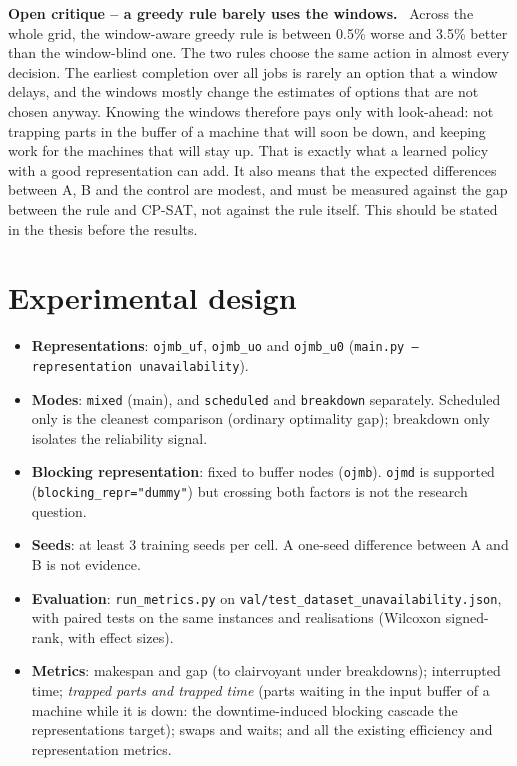 \documentclass[11pt,a4paper]{article}
\newenvironment{critique}[1]{%
  \par\medskip\noindent\textbf{\color{critic}Open critique -- #1.}\ }{\par\medskip}
\newcommand{\code}[1]{\texttt{#1}}
\begin{document}
\begin{critique}{a greedy rule barely uses the windows}
Across the whole grid, the window-aware greedy rule is between 0.5\% worse and 3.5\% better
than the window-blind one. The two rules choose the same action in almost every decision. The earliest
completion over all jobs is rarely an option that a window delays, and the windows mostly change
the estimates of options that are not chosen anyway. Knowing the windows therefore pays only
with look-ahead: not trapping parts in the buffer of a machine that will soon be down, and
keeping work for the machines that will stay up. That is exactly what a learned policy with a
good representation can add. It also means that the expected differences between A, B and the
control are modest, and must be measured against the gap between the rule and CP-SAT, not
against the rule itself. This should be stated in the thesis before the results.
\end{critique}

\section{Experimental design}
\label{sec:design}

\begin{itemize}[nosep]
  \item \textbf{Representations}: \code{ojmb\_uf}, \code{ojmb\_uo} and \code{ojmb\_u0}
        (\code{main.py --representation unavailability}).
  \item \textbf{Modes}: \code{mixed} (main), and \code{scheduled} and \code{breakdown} separately.
        Scheduled only is the cleanest comparison (ordinary optimality gap); breakdown only
        isolates the reliability signal.
  \item \textbf{Blocking representation}: fixed to buffer nodes (\code{ojmb}). \code{ojmd}
        is supported (\code{blocking\_repr="dummy"}) but crossing both factors is not the
        research question.
  \item \textbf{Seeds}: at least 3 training seeds per cell. A one-seed difference between A and
        B is not evidence.
  \item \textbf{Evaluation}: \code{run\_metrics.py} on \code{val/test\_dataset\_unavailability.json},
        with paired tests on the same instances and realisations (Wilcoxon signed-rank, with
        effect sizes).
  \item \textbf{Metrics}: makespan and gap (to clairvoyant under breakdowns); interrupted time;
        \emph{trapped parts and trapped time} (parts waiting in the input buffer of a machine
        while it is down: the downtime-induced blocking cascade the representations target);
        swaps and waits; and all the existing efficiency and representation metrics.
\end{itemize}
\end{document}
